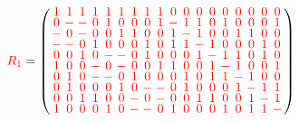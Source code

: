 \documentclass{beamer}
\newcommand{\rred}[1]{\textcolor{red}{#1}}
\begin{document}
\begin{frame}

  \[
    \rred{R_1} =
    \left(
      \arraycolsep=1.25pt\def\arraystretch{0.625}
      \begin{array}{cccccccccccccccccc}
        \rred{1}&\rred{1}&\rred{1}&\rred{1}&\rred{1}&\rred{1}&\rred{1}&\rred{1}&\rred{1}&\rred{0}&\rred{0}&\rred{0}&\rred{0}&\rred{0}&\rred{0}&\rred{0}&\rred{0}&\rred{0}\\
        \rred{0}&\rred{-}&\rred{-}&\rred{0}&\rred{1}&\rred{0}&\rred{0}&\rred{0}&\rred{1}&\rred{-}&\rred{1}&\rred{1}&\rred{0}&\rred{1}&\rred{0}&\rred{0}&\rred{0}&\rred{1}\\
        \rred{-}&\rred{0}&\rred{-}&\rred{0}&\rred{0}&\rred{1}&\rred{1}&\rred{0}&\rred{0}&\rred{1}&\rred{-}&\rred{1}&\rred{0}&\rred{0}&\rred{1}&\rred{1}&\rred{0}&\rred{0}\\
        \rred{-}&\rred{-}&\rred{0}&\rred{1}&\rred{0}&\rred{0}&\rred{0}&\rred{1}&\rred{0}&\rred{1}&\rred{1}&\rred{-}&\rred{1}&\rred{0}&\rred{0}&\rred{0}&\rred{1}&\rred{0}\\
        \rred{0}&\rred{0}&\rred{1}&\rred{0}&\rred{-}&\rred{-}&\rred{0}&\rred{1}&\rred{0}&\rred{0}&\rred{0}&\rred{1}&\rred{-}&\rred{1}&\rred{1}&\rred{0}&\rred{1}&\rred{0}\\
        \rred{1}&\rred{0}&\rred{0}&\rred{-}&\rred{0}&\rred{-}&\rred{0}&\rred{0}&\rred{1}&\rred{1}&\rred{0}&\rred{0}&\rred{1}&\rred{-}&\rred{1}&\rred{0}&\rred{0}&\rred{1}\\
        \rred{0}&\rred{1}&\rred{0}&\rred{-}&\rred{-}&\rred{0}&\rred{1}&\rred{0}&\rred{0}&\rred{0}&\rred{1}&\rred{0}&\rred{1}&\rred{1}&\rred{-}&\rred{1}&\rred{0}&\rred{0}\\
        \rred{0}&\rred{1}&\rred{0}&\rred{0}&\rred{0}&\rred{1}&\rred{0}&\rred{-}&\rred{-}&\rred{0}&\rred{1}&\rred{0}&\rred{0}&\rred{0}&\rred{1}&\rred{-}&\rred{1}&\rred{1}\\
        \rred{0}&\rred{0}&\rred{1}&\rred{1}&\rred{0}&\rred{0}&\rred{-}&\rred{0}&\rred{-}&\rred{0}&\rred{0}&\rred{1}&\rred{1}&\rred{0}&\rred{0}&\rred{1}&\rred{-}&\rred{1}\\
        \rred{1}&\rred{0}&\rred{0}&\rred{0}&\rred{1}&\rred{0}&\rred{-}&\rred{-}&\rred{0}&\rred{1}&\rred{0}&\rred{0}&\rred{0}&\rred{1}&\rred{0}&\rred{1}&\rred{1}&\rred{-}\\
      \end{array}
    \right)
  \]
  
\end{frame}
\end{document}
